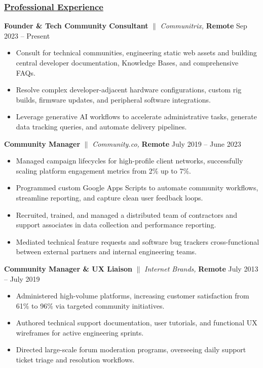 \documentclass[a4paper,10pt]{article}
\begin{document}
\subsubsection{\underline{Professional Experience}}
{\textbf{Founder \& Tech Community Consultant} {$\parallel$} \textit{Communitrix,}  \textbf{Remote} \hfill {Sep 2023 – Present}}
\begin{itemize}
      \item Consult for technical communities, engineering static web assets and building central developer documentation, Knowledge Bases, and comprehensive FAQs.
      \item Resolve complex developer-adjacent hardware configurations, custom rig builds, firmware updates, and peripheral software integrations.
      \item Leverage generative AI workflows to accelerate administrative tasks, generate data tracking queries, and automate delivery pipelines.
\end{itemize}
\vspace{1.5mm}
{\textbf{Community Manager} {$\parallel$} \textit{Community.co,}  \textbf{Remote} \hfill {July 2019 – June 2023}}
\begin{itemize}
      \item Managed campaign lifecycles for high-profile client networks, successfully scaling platform engagement metrics from 2\% up to 7\%.
      \item Programmed custom Google Apps Scripts to automate community workflows, streamline reporting, and capture clean user feedback loops.
      \item Recruited, trained, and managed a distributed team of contractors and support associates in data collection and performance reporting.
      \item Mediated technical feature requests and software bug trackers cross-functional between external partners and internal engineering teams.
\end{itemize}
\vspace{1.5mm}
{\textbf{Community Manager \& UX Liaison} {$\parallel$} \textit{Internet Brands,}  \textbf{Remote} \hfill {July 2013 – July 2019}}
\begin{itemize}
      \item Administered high-volume platforms, increasing customer satisfaction from 61\% to 96\% via targeted community initiatives.
      \item Authored technical support documentation, user tutorials, and functional UX wireframes for active engineering sprints.
      \item Directed large-scale forum moderation programs, overseeing daily support ticket triage and resolution workflows.
\end{itemize}
\end{document}
